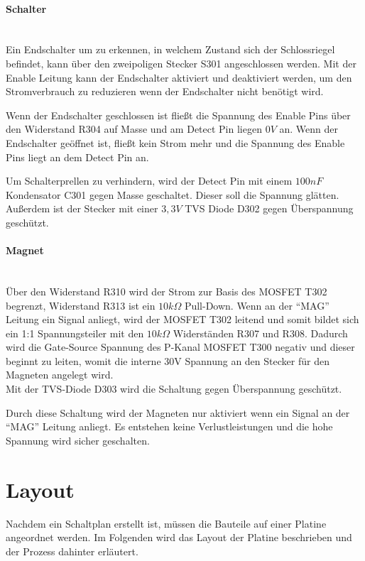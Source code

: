 \paragraph{Schalter}\mbox{}\\
Ein Endschalter um zu erkennen, in welchem Zustand sich der Schlossriegel befindet, kann über den zweipoligen Stecker S301
angeschlossen werden. Mit der Enable Leitung kann der Endschalter aktiviert und deaktiviert werden, um den Stromverbrauch
zu reduzieren wenn der Endschalter nicht benötigt wird. 

Wenn der Endschalter geschlossen ist fließt die Spannung des Enable Pins über den Widerstand R304 auf Masse und am 
Detect Pin liegen \(0V\) an. Wenn der Endschalter geöffnet ist, fließt kein Strom mehr und die Spannung des Enable Pins
liegt an dem Detect Pin an. 

Um Schalterprellen zu verhindern, wird der Detect Pin mit einem \(100nF\) Kondensator C301 gegen Masse geschaltet. Dieser
soll die Spannung glätten. Außerdem ist der Stecker mit einer \(3,3V\) TVS Diode D302 gegen Überspannung geschützt.

\paragraph{Magnet}\mbox{}\\
Über den Widerstand R310 wird der Strom zur Basis des \ac{MOSFET} T302 begrenzt, Widerstand R313 ist ein \(10k\Omega\) Pull-Down.
Wenn an der \enquote{MAG} Leitung ein Signal anliegt, wird der \ac{MOSFET} T302 leitend und somit bildet sich ein 1:1 Spannungsteiler
mit den \(10k\Omega\) Widerständen R307 und R308. Dadurch wird die Gate-Source Spannung des P-Kanal \ac{MOSFET} T300 negativ 
und dieser beginnt zu leiten, womit die interne 30V Spannung an den Stecker für den Magneten angelegt wird. \\
Mit der TVS-Diode D303 wird die Schaltung gegen Überspannung geschützt.

Durch diese Schaltung wird der Magneten nur aktiviert wenn ein Signal an der \enquote{MAG} Leitung anliegt. Es entstehen keine
Verlustleistungen und die hohe Spannung wird sicher geschalten.

\clearpage

\section{Layout}
Nachdem ein Schaltplan erstellt ist, müssen die Bauteile auf einer Platine angeordnet werden. Im Folgenden wird das Layout der
Platine beschrieben und der Prozess dahinter erläutert.


